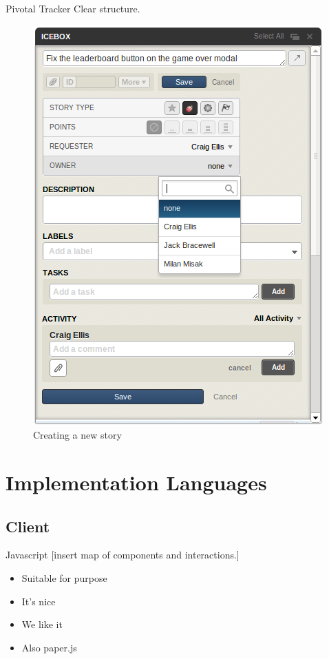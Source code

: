 \documentclass{beamer}
\begin{document}
\begin{frame}{Pivotal Tracker}
  Clear structure.\\
  \begin{figure}[hb]
    \centering
    \includegraphics[scale=0.25]{pivotal_new_story.png}
    \caption{Creating a new story}
  \end{figure}
\end{frame}


\section{Implementation Languages}
\subsection{Client}

\begin{frame}{Javascript}
  [insert map of components and interactions.]
  \begin{itemize}
    \item Suitable for purpose
    \item It's nice
    \item We like it
    \item Also paper.js
  \end{itemize}
\end{frame}
\end{document}
